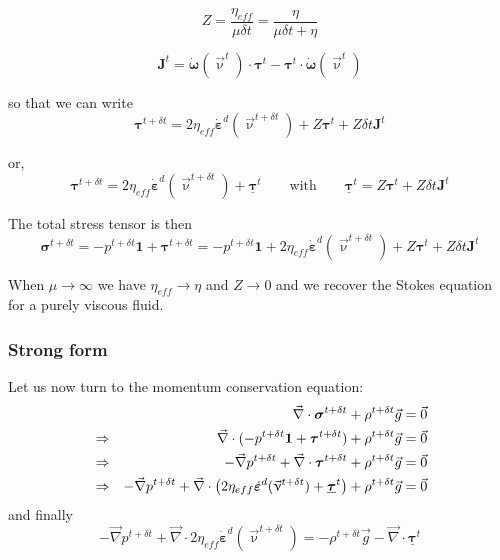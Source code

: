 \[
\boxed{
Z=\frac{\eta_{eff}}{\mu \delta t} = \frac{\eta}{\mu \delta t + \eta}
}
\]

\[
\boxed{
{\bm J}^t=  \dot{\bm \omega}(\vec\upnu^t) \cdot {\bm \tau}^t - {\bm \tau}^t \cdot \dot{\bm \omega}(\vec\upnu^t)  
}
\]

so that we can write 
\[
{\bm \tau}^{t+\delta t} 
=
2 \eta_{eff}   \dot{\bm \varepsilon}^d(\vec\upnu^{t+\delta t}) 
+ Z {\bm \tau}^t 
+ Z \delta t {\bm J}^t
\]

or,  
\[
{\bm \tau}^{t+\delta t} 
= 2 \eta_{eff}   \dot{\bm \varepsilon}^d(\vec\upnu^{t+\delta t}) +  \underline{\bm \tau}^{t}
\qquad
\text{with}
\qquad
\underline{\bm \tau}^{t} = 
 Z  {\bm \tau}^t + Z \delta t {\bm J}^t 
\]


The total stress tensor is then 
\begin{equation}
\boxed{
{\bm \sigma}^{t+\delta t} 
= -p^{t+\delta t} {\bm 1} + {\bm \tau}^{t+\delta t} 
= - p^{t+\delta t} {\bm 1} + 2 \eta_{eff}   \dot{\bm \varepsilon}^d(\vec\upnu^{t+\delta t}) 
+  Z  {\bm \tau}^t + Z \delta t {\bm J}^t
}
\label{eq:sigmaev}
\end{equation}

\begin{remark}
When $\mu\rightarrow \infty$ we have
$\eta_{eff} \rightarrow \eta$ and $Z \rightarrow 0$ and 
we recover the Stokes equation for a purely viscous fluid.
\end{remark}

\subsubsection{Strong form}

Let us now turn to the momentum conservation equation:
\begin{eqnarray}
&&{\vec \nabla}\cdot {\bm \sigma}^{t+\delta t} + \rho^{t+\delta t} {\vec g} = \vec{0} \nonumber\\
&\Rightarrow&
{\vec \nabla}\cdot (-p^{t+\delta t} {\bm 1}+  {\bm \tau}^{t+\delta t})+\rho^{t+\delta t}{\vec g}= \vec{0} \nonumber\\
&\Rightarrow&
- {\vec \nabla}p^{t+\delta t} +  {\vec \nabla}\cdot  {\bm \tau}^{t+\delta t} + \rho^{t+\delta t} {\vec g} = \vec{0} \nonumber\\
&\Rightarrow&
- {\vec \nabla}p^{t+\delta t} +  {\vec \nabla}\cdot  
\left(
2 \eta_{eff}   \dot{\bm \varepsilon}^d(\vec\upnu^{t+\delta t}) 
+  \underline{\bm \tau}^{t}
\right)
+ \rho^{t+\delta t} {\vec g} = \vec{0} \nonumber
\end{eqnarray}
and finally
\[
\boxed{
- {\vec \nabla}p^{t+\delta t} +  {\vec \nabla}\cdot  
2 \eta_{eff}   \dot{\bm \varepsilon}^d(\vec\upnu^{t+\delta t}) 
 = - \rho^{t+\delta t} {\vec g}
-{\vec \nabla}\cdot  \underline{\bm \tau}^{t}
}
\]

